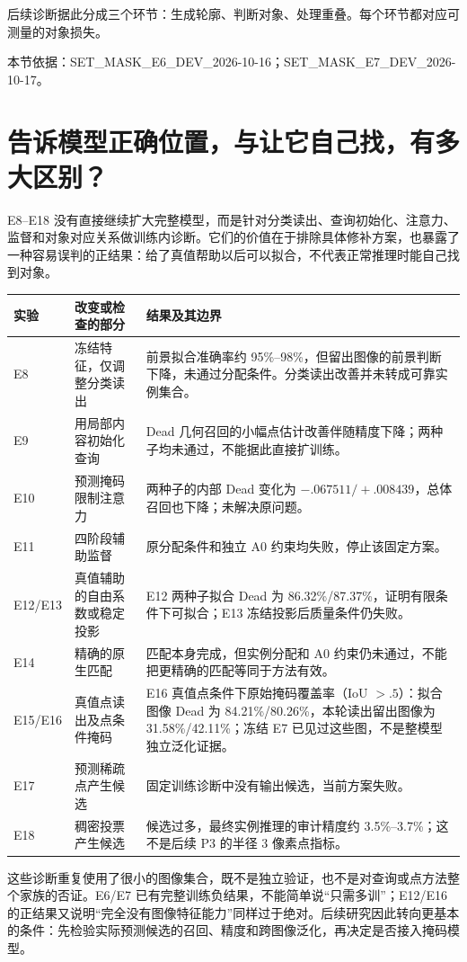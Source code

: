 \documentclass[UTF8,zihao=-4,fontset=windows]{ctexart}
\newcommand{\src}[1]{\par{\footnotesize\color{gray}本节依据：#1}\par}
\begin{document}
后续诊断据此分成三个环节：生成轮廓、判断对象、处理重叠。每个环节都对应可测量的对象损失。

\src{SET\_\allowbreak{}MASK\_\allowbreak{}E6\_\allowbreak{}DEV\_\allowbreak{}2026-10-16；SET\_\allowbreak{}MASK\_\allowbreak{}E7\_\allowbreak{}DEV\_\allowbreak{}2026-10-17。}

\section{告诉模型正确位置，与让它自己找，有多大区别？}

E8--E18 没有直接继续扩大完整模型，而是针对分类读出、查询初始化、注意力、监督和对象对应关系做训练内诊断。它们的价值在于排除具体修补方案，也暴露了一种容易误判的正结果：给了真值帮助以后可以拟合，不代表正常推理时能自己找到对象。

\begin{longtable}{p{20mm}p{45mm}p{80mm}}
\toprule 实验 & 改变或检查的部分 & 结果及其边界\\\midrule\endhead
E8 & 冻结特征，仅调整分类读出 & 前景拟合准确率约 95\%--98\%，但留出图像的前景判断下降，未通过分配条件。分类读出改善并未转成可靠实例集合。\\
E9 & 用局部内容初始化查询 & Dead 几何召回的小幅点估计改善伴随精度下降；两种子均未通过，不能据此直接扩训练。\\
E10 & 预测掩码限制注意力 & 两种子的内部 Dead 变化为 $-.067511/+.008439$，总体召回也下降；未解决原问题。\\
E11 & 四阶段辅助监督 & 原分配条件和独立 A0 约束均失败，停止该固定方案。\\
E12/E13 & 真值辅助的自由系数或稳定投影 & E12 两种子拟合 Dead 为 86.32\%/87.37\%，证明有限条件下可拟合；E13 冻结投影后质量条件仍失败。\\
E14 & 精确的原生匹配 & 匹配本身完成，但实例分配和 A0 约束仍未通过，不能把更精确的匹配等同于方法有效。\\
E15/E16 & 真值点读出及点条件掩码 & E16 真值点条件下原始掩码覆盖率（IoU $>.5$）：拟合图像 Dead 为 84.21\%/80.26\%，本轮读出留出图像为 31.58\%/42.11\%；冻结 E7 已见过这些图，不是整模型独立泛化证据。\\
E17 & 预测稀疏点产生候选 & 固定训练诊断中没有输出候选，当前方案失败。\\
E18 & 稠密投票产生候选 & 候选过多，最终实例推理的审计精度约 3.5\%--3.7\%；这不是后续 P3 的半径 3 像素点指标。\\\bottomrule
\end{longtable}

这些诊断重复使用了很小的图像集合，既不是独立验证，也不是对查询或点方法整个家族的否证。E6/E7 已有完整训练负结果，不能简单说“只需多训”；E12/E16 的正结果又说明“完全没有图像特征能力”同样过于绝对。后续研究因此转向更基本的条件：先检验实际预测候选的召回、精度和跨图像泛化，再决定是否接入掩码模型。
\end{document}

